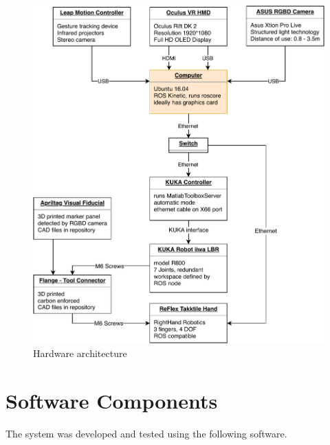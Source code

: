 \documentclass[headsepline,footinclude=false,fontsize=11pt,paper=a4,listof=totoc,bibliography=totoc,BCOR=12mm,DIV=14]{scrbook}
\begin{document}
\begin{figure}[p]
    \centering
    \includegraphics[width=\textwidth]{images/hardware}
    \caption{Hardware architecture}
    \label{fig:hardware_architecture}
\end{figure}

\section{Software Components}

The system was developed and tested using the following software.
\end{document}
